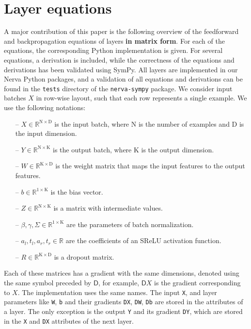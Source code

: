 \documentclass{article}
\newcommand{\const}[1]{\ensuremath{\mathrm{#1}}} %
\newcommand{\Gradient}{\textsf{D}}
\newcommand{\Reals}{\mathbb{R}}
\begin{document}
\section{Layer equations} \label{section:layer-equations}
A major contribution of this paper is the following overview of the feedforward and backpropagation equations of layers \textbf{in matrix form}. For each of the equations, the corresponding Python implementation is given. For several equations, a derivation is included, while the correctness of the equations and derivations has been validated using SymPy. All layers are implemented in our Nerva Python packages, and a validation of all equations and derivations can be found in the \texttt{tests} directory of the \texttt{nerva-sympy} package. We consider input batches $X$ in row-wise layout, such that each row represents a single example. We use the following notations:
\begin{enumerate}
    \item[--] $X \in \Reals^{\const{N} \times \const{D}}$ is the input batch, where $\const{N}$ is the number of examples and $\const{D}$ is the input dimension.
    \item[--] $Y \in \Reals^{\const{N} \times \const{K}}$ is the output batch, where $\const{K}$ is the output dimension.
    \item[--] $W \in \Reals^{\const{K} \times \const{D}}$ is the weight matrix that maps the input features to the output features.
    \item[--] $b \in \Reals^{1 \times \const{K}}$ is the bias vector.
    \item[--] $Z \in \Reals^{\const{N} \times \const{K}}$ is a matrix with intermediate values.
    \item[--] $\beta, \gamma, \Sigma \in \Reals^{1 \times \const{K}}$ are the parameters of batch normalization.
    \item [--] $a_l, t_l, a_r, t_r \in \Reals$ are the coefficients of an SReLU activation function.
    \item[--] $R \in \Reals^{\const{K} \times \const{D}}$ is a dropout matrix.
\end{enumerate}
Each of these matrices has a gradient with the same dimensions, denoted using the same symbol preceded by $\Gradient{}$, for example, $\Gradient{X}$ is the gradient corresponding to $X$. The implementation uses the same names. The input \texttt{X}, and layer parameters like \texttt{W}, \texttt{b} and their gradients \texttt{DX}, \texttt{DW}, \texttt{Db} are stored in the attributes of a layer. The only exception is the output \texttt{Y} and its gradient \texttt{DY}, which are stored in the \texttt{X} and \texttt{DX} attributes of the next layer.
\end{document}
